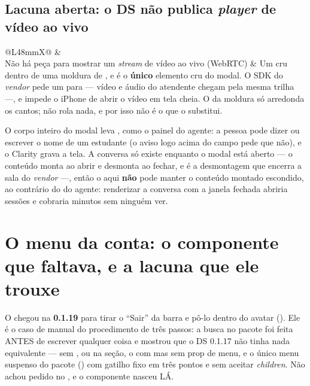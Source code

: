 \subsection{Lacuna aberta: o DS não publica \emph{player} de vídeo ao vivo}

\begin{tabularx}{\linewidth}{@{}L{48mm}X@{}}
\toprule
\headrow {} & \\
\midrule
Não há peça para mostrar um \emph{stream} de vídeo ao vivo (WebRTC) & Um
   cru dentro de uma moldura de
  , e é o \textbf{único} elemento cru do modal. O SDK do \emph{vendor} pede
  um  para  --- vídeo e áudio do atendente
  chegam pela mesma trilha ---, e  impede o iPhone de abrir o
  vídeo em tela cheia. O  da moldura só arredonda os
  cantos; não rola nada, e por isso não é o  que o 
  substitui.\\
\bottomrule
\end{tabularx}

\begin{nota}
O corpo inteiro do modal leva , como o painel do agente: a
pessoa pode dizer ou escrever o nome de um estudante (o aviso logo acima do campo
pede que não), e o Clarity grava a tela. A conversa só existe enquanto o modal
está aberto --- o conteúdo monta ao abrir e desmonta ao fechar, e é a
desmontagem que encerra a sala do \emph{vendor} ---, então o  aqui
\textbf{não} pode manter o conteúdo montado escondido, ao contrário do
 do agente: renderizar a conversa com a janela fechada abriria
sessões e cobraria minutos sem ninguém ver.
\end{nota}

\section{O menu da conta: o componente que faltava, e a lacuna que ele trouxe}

O  chegou na \textbf{0.1.19} para tirar o \enquote{Sair} da barra
e pô-lo dentro do avatar (). Ele é o caso de manual do procedimento
de três passos: a busca no pacote foi feita ANTES de escrever qualquer coisa e
mostrou que o DS 0.1.17 não tinha nada equivalente --- sem ,
 ou  na seção, o  com  mas sem prop
de menu, e o único menu suspenso do pacote () com gatilho
fixo em três pontos e sem aceitar \emph{children}. Não achou \implica{} pedido no
, e o componente nasceu LÁ.

